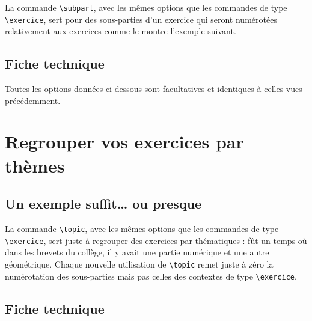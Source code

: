 \documentclass[12pt,a4paper]{scrartcl}
\makeatletter
\theoremstyle{definition}
\newcommand\resetallcnt{
    	\setcounter{lyxam@counter@topic}{0}
    	\setcounter{lyxam@counter@exercise}{0}
    	\setcounter{lyxam@counter@problem}{0}
    	\setcounter{lyxam@counter@bonus}{0}
    	\setcounter{lyxam@counter@subpart}{0}
    }
\newcommand\IDmacro{\@ifstar{\@IDmacroStar}{\@IDmacroNoStar}}
\newcommand\@IDmacroNoStar[3]{%
        \texttt{%
        	\textbackslash#1%
        	\IfStrEq{#2}{0}{}{%
        		\,\,[#2 Option%
    			\IfStrEq{#2}{1}{}{s}]%
    		}%
    	    \IfStrEq{#3}{}{}{%
        		\,\,(#3 Argument%
    			\IfStrEq{#3}{1}{}{s})%
    		}
       	}
        \immediate\write\tempfile{macro@#1@#2@#3}%
    }
\newcommand\@IDmacroStar[2]{%
        \@IDmacroNoStar{#1}{0}{#2}%
    }
\makeatother
\begin{document}
La commande \verb+\subpart+, avec les mêmes options que les commandes de type \verb+\exercice+, sert pour des sous-parties d'un exercice qui seront numérotées relativement aux exercices comme le montre l'exemple suivant.

\resetallcnt{}

\begin{tcblisting}{}
\exercise
\subpart
\subpart

\exercise
\subpart
\subpart
\end{tcblisting}


    \subsection{Fiche technique}

Toutes les options données ci-dessous sont facultatives et identiques à celles vues précédemment.

\bigskip


\IDmacro{subpart}{6}{}

\exosoptions{}



\section{Regrouper vos exercices par thèmes}

    \subsection{Un exemple suffit\dots{} ou presque}

La commande \verb+\topic+, avec les mêmes options que les commandes de type \verb+\exercice+, sert juste à regrouper des exercices par thématiques : fût un temps où dans les brevets du collège, il y avait une partie numérique et une autre géométrique.
Chaque nouvelle utilisation de \verb+\topic+ remet juste à zéro la numérotation des sous-parties mais pas celles des contextes de type \verb+\exercice+.

\resetallcnt{}

\resetallcnt{}

\begin{tcblisting}{}
\topic
\exercise
\exercise

\topic
\exercise
\end{tcblisting}


    \subsection{Fiche technique}
\end{document}
